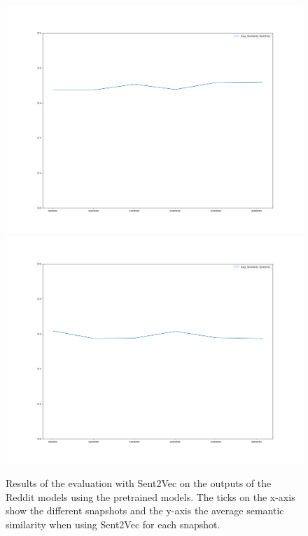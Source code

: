 \begin{figure}[H]
	\includegraphics[width=\linewidth]{img/plots/reddit/s2v_wiki_cosine_similarity.png}
	\centering
	\small
	\endminipage\hfill
	\includegraphics[width=\linewidth]{img/plots/reddit/s2v_twitter_cosine_similarity.png}
	\centering
	\small
	\endminipage\hfill
	\caption{Results of the evaluation with Sent2Vec on the outputs of the Reddit models using the pretrained models. The ticks on the x-axis show the different snapshots and the y-axis the average semantic similarity when using Sent2Vec for each snapshot.}
	\label{results:sent2vec:reddit:results}
\end{figure}

